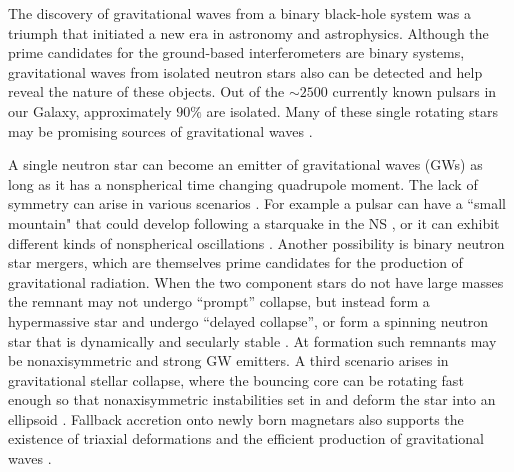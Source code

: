 \documentclass[twocolumn,superscriptaddress,showpacs,prd,aps,amsmath,amssymb,nofootinbib]{revtex4-1}
\begin{document}
The discovery of
gravitational waves \cite{abbott2016a} from a binary black-hole system
was a triumph that initiated a new era in astronomy and astrophysics.
Although the prime candidates for the ground-based interferometers are
binary systems, gravitational waves from isolated neutron stars also
can be detected and help reveal the nature of these objects.  Out of
the $\sim 2500$ currently known pulsars in our Galaxy, approximately
$90\%$ are isolated. Many of these single rotating stars may be
promising sources of gravitational waves \cite{EatH,
  Aasietal2013,Papaetal2016}.

A single neutron star can become an emitter of gravitational waves (GWs) as long as it has a 
nonspherical time changing quadrupole moment. 
The lack of symmetry can arise in various scenarios \cite{CA, A2010,K03}.
For example a pulsar can have a ``small mountain" that could develop following a starquake in the NS 
\cite{ST83, HJA2006}, or it can exhibit different kinds of nonspherical oscillations \cite{FS14}.
Another possibility is binary neutron star mergers, which are themselves prime candidates
for the production of gravitational radiation. When the two component stars do not have large masses 
the remnant may not undergo ``prompt'' collapse, but instead form a hypermassive star and undergo
``delayed collapse'', or form a spinning neutron star that is dynamically and secularly stable \cite{BR2016}.
At formation such remnants may be nonaxisymmetric and strong GW emitters.
A third scenario arises in gravitational stellar collapse, where the 
bouncing core can be rotating fast enough so that
nonaxisymmetric instabilities set in and deform the star into an ellipsoid \cite{LS1995}.
Fallback accretion onto newly born magnetars also supports the existence of triaxial deformations and 
the efficient production of gravitational waves \cite{PO2011}.
\end{document}
